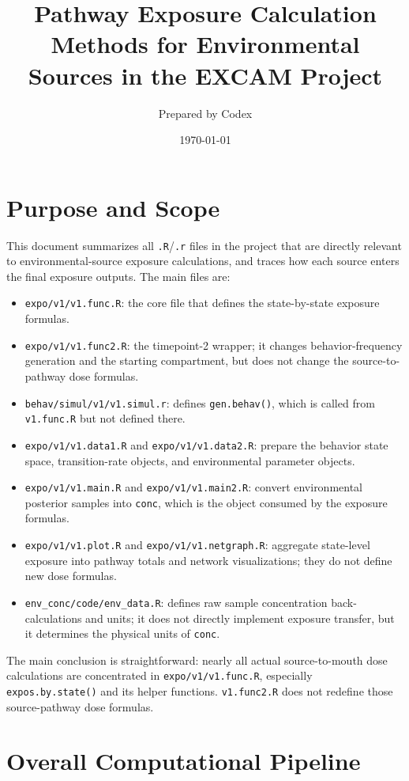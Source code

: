 \documentclass[11pt]{article}
\title{Pathway Exposure Calculation Methods for Environmental Sources in the EXCAM Project}
\author{Prepared by Codex}
\date{\today}
\begin{document}
\maketitle

\section{Purpose and Scope}
This document summarizes all \texttt{.R}/\texttt{.r} files in the project that are directly relevant to environmental-source exposure calculations, and traces how each source enters the final exposure outputs. The main files are:
\begin{itemize}[leftmargin=2em]
  \item \texttt{expo/v1/v1.func.R}: the core file that defines the state-by-state exposure formulas.
  \item \texttt{expo/v1/v1.func2.R}: the timepoint-2 wrapper; it changes behavior-frequency generation and the starting compartment, but does not change the source-to-pathway dose formulas.
  \item \texttt{behav/simul/v1/v1.simul.r}: defines \texttt{gen.behav()}, which is called from \texttt{v1.func.R} but not defined there.
  \item \texttt{expo/v1/v1.data1.R} and \texttt{expo/v1/v1.data2.R}: prepare the behavior state space, transition-rate objects, and environmental parameter objects.
  \item \texttt{expo/v1/v1.main.R} and \texttt{expo/v1/v1.main2.R}: convert environmental posterior samples into \texttt{conc}, which is the object consumed by the exposure formulas.
  \item \texttt{expo/v1/v1.plot.R} and \texttt{expo/v1/v1.netgraph.R}: aggregate state-level exposure into pathway totals and network visualizations; they do not define new dose formulas.
  \item \texttt{env\_conc/code/env\_data.R}: defines raw sample concentration back-calculations and units; it does not directly implement exposure transfer, but it determines the physical units of \texttt{conc}.
\end{itemize}

The main conclusion is straightforward: nearly all actual source-to-mouth dose calculations are concentrated in \texttt{expo/v1/v1.func.R}, especially \texttt{expos.by.state()} and its helper functions. \texttt{v1.func2.R} does not redefine those source-pathway dose formulas.

\section{Overall Computational Pipeline}
\end{document}

